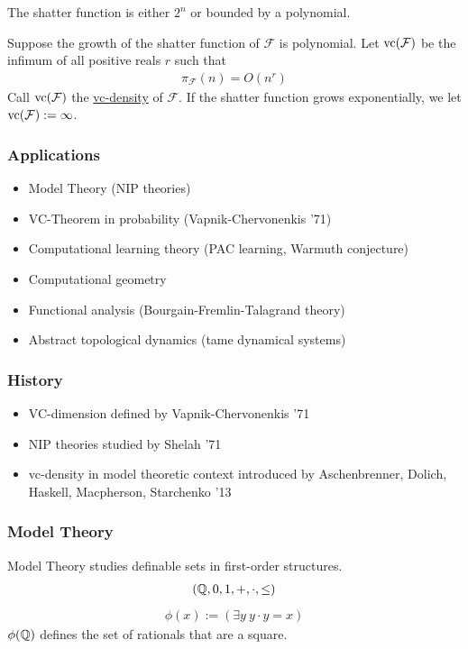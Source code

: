 \documentclass{beamer}
\newcommand{\F}{\mathcal F}
\newcommand{\paren}[1]{\left( #1 \right)}
\newcommand{\defn}{\underline}
\begin{document}
\begin{frame}
	\begin{Theorem} 
		The shatter function is either $2^n$ or bounded by a polynomial.
	\end{Theorem}
	\begin{Definition}
		Suppose the growth of the shatter function of $\F$ is polynomial.
		Let $\vc(\F)$ be the infimum of all positive reals $r$ such that
		\begin{align*}
			\pi_\F(n) = O(n^r)
		\end{align*}
		Call $\vc(\F)$ the \defn{vc-density} of $\F$.
		If the shatter function grows exponentially, we let $\vc(\F) := \infty$.
	\end{Definition}
\end{frame}

\begin{frame}
	\frametitle{Applications}
	\begin{itemize}
		\item Model Theory (NIP theories)
		\item VC-Theorem in probability (Vapnik-Chervonenkis '71)
		\item Computational learning theory (PAC learning, Warmuth conjecture)
		\item Computational geometry
		\item Functional analysis (Bourgain-Fremlin-Talagrand theory)
		\item Abstract topological dynamics (tame dynamical systems)
	\end{itemize}
\end{frame}

\begin{frame}
	\frametitle{History}
	\begin{itemize}
		\item VC-dimension defined by Vapnik-Chervonenkis '71
		\item NIP theories studied by Shelah '71
		\item vc-density in model theoretic context introduced by Aschenbrenner, Dolich, Haskell, Macpherson, Starchenko '13
	\end{itemize}
\end{frame}

\begin{frame}
	\frametitle{Model Theory}
	Model Theory studies definable sets in first-order structures.
	\begin{align*}
		(\mathbb{Q}, 0, 1, +, \cdot, \leq)
	\end{align*}
	\begin{align*}
		\phi(x) := \paren{\exists y \ y \cdot y = x}
	\end{align*}
	$\phi(\mathbb{Q})$ defines the set of rationals that are a square.
\end{frame}
\end{document}
